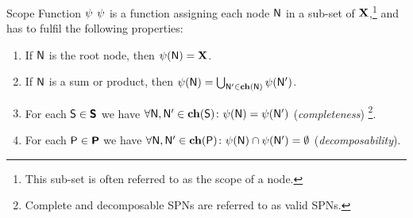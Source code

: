 \begin{frame}{Scope Function $\psi$}
$\psi$ is a function assigning each node $\mathsf{N}$ in a sub-set of $\mathbf{X}$,\footnote{\scriptsize This sub-set is often referred to as the scope of a node.} and has to fulfil the following properties: 
\begin{defbox}
\begin{enumerate}
\item If $\mathsf{N}$ is the root node, then $\psi(\mathsf{N}) = \mathbf{X}$.
\item If $\mathsf{N}$ is a sum or product, then $\psi(\mathsf{N}) = \bigcup_{\mathsf{N}' \in \mathbf{ch}(\mathsf{N})} \psi(\mathsf{N}')$.
\item For each $\mathsf{S} \in \bm{\mathsf{S}}$ we have $\forall \mathsf{N}, \mathsf{N}' \in \mathbf{ch}(\mathsf{S})\colon \psi(\mathsf{N}) = \psi(\mathsf{N}')$ (\emph{completeness}) \footnote{\scriptsize Complete and decomposable SPNs are referred to as valid SPNs.}.
\item For each $\mathsf{P} \in \bm{\mathsf{P}}$ we have $\forall \mathsf{N}, \mathsf{N}' \in \mathbf{ch}(\mathsf{P})\colon \psi(\mathsf{N}) \cap \psi(\mathsf{N}') = \emptyset$ (\emph{decomposability}).
\end{enumerate}
\end{defbox}
\end{frame}

